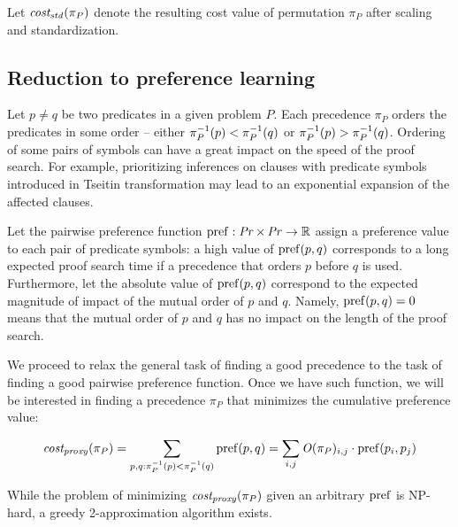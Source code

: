 Let \(\operatorname{\mathit{cost_{std}}}(\pi_P)\) denote the resulting cost value of permutation \(\pi_P\)
after scaling and standardization.

\subsection{Reduction to preference learning}

Let \(p \neq q\) be two predicates in a given \gls{problem} \(P\).
Each precedence \(\pi_P\) orders the predicates in some order --
either \(\pi_P^{-1}(p) < \pi_P^{-1}(q)\) or \(\pi_P^{-1}(p) > \pi_P^{-1}(q)\).
Ordering of some pairs of symbols can have a great impact on the speed of the proof search.
For example, prioritizing inferences on clauses with predicate symbols
introduced in Tseitin transformation
may lead to an exponential expansion of the affected clauses.

Let the pairwise preference
function \(\operatorname{pref} : \operatorname{\mathit{Pr}} \times \operatorname{\mathit{Pr}} \rightarrow \operatorname{\mathbb{R}}\)
assign a preference value to each pair of predicate symbols:
a high value of \(\operatorname{pref}(p, q)\) corresponds to a long expected proof search time
if a precedence that orders \(p\) before \(q\) is used.
Furthermore, let the absolute value of \(\operatorname{pref}(p, q)\)
correspond to the expected magnitude of impact of the mutual order of \(p\) and \(q\).
Namely, \(\operatorname{pref}(p, q) = 0\) means that the mutual order of \(p\) and \(q\)
has no impact on the length of the proof search.

We proceed to relax the general task of finding a good precedence
to the task of finding a good pairwise preference function.
Once we have such function,
we will be interested in finding a precedence \(\pi_P\) that minimizes the cumulative preference value:

\begin{align*}
\operatorname{\mathit{cost_{proxy}}}(\pi_P) = \sum_{p, q: \pi_P^{-1}(p) < \pi_P^{-1}(q)} \operatorname{pref}(p, q)
= \sum_{i, j} \operatorname{\mathit{O}}(\pi_P)_{i, j} \cdot \operatorname{pref}(p_i, p_j)
\end{align*}

While the problem of minimizing \(\operatorname{\mathit{cost_{proxy}}}(\pi_P)\) given an arbitrary \(\operatorname{pref}\) is NP-hard,
a greedy 2-approximation algorithm exists.\cite{Cohen2011}

